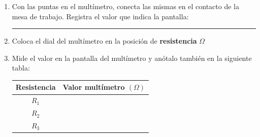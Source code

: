 \documentclass[14pt]{extarticle}
\begin{document}
\begin{enumerate}
\item Con las puntas en el multímetro, conecta las mismas en el contacto de la mesa de trabajo. Registra el valor que indica la pantalla: \rule{2cm}{0.1mm}
\item Coloca el dial del multímetro en la posición de \textbf{resistencia} {\huge{$\Omega$}}
\item Mide el valor en la pantalla del multímetro y anótalo también en la siguiente tabla:
\begin{table}[H]
\centering
\begin{tabular}{| c | c |} \hline
Resistencia & Valor multímetro $(\Omega)$ \\ \hline
$R_{1}$ & \\ \hline
$R_{2}$ & \\ \hline
$R_{3}$ & \\ \hline
\end{tabular}
\end{table}
\end{enumerate}
\end{document}
